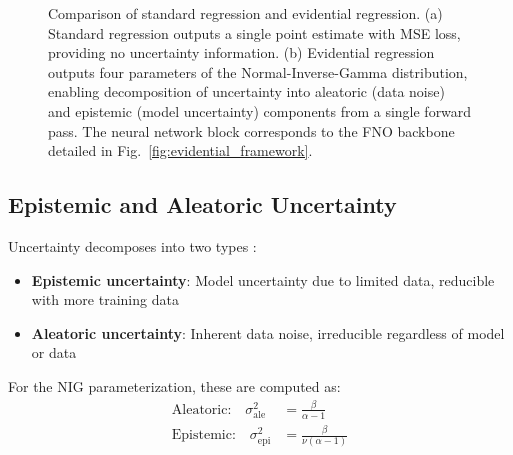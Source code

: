 \begin{figure}[htbp]
{%
}
\caption{Comparison of standard regression and evidential regression. (a) Standard regression outputs a single point estimate with MSE loss, providing no uncertainty information. (b) Evidential regression outputs four parameters of the Normal-Inverse-Gamma distribution, enabling decomposition of uncertainty into aleatoric (data noise) and epistemic (model uncertainty) components from a single forward pass. The neural network block corresponds to the FNO backbone detailed in Fig.~\ref{fig:evidential_framework}.}
\label{fig:standard_vs_evidential}
\end{figure}

\subsection{Epistemic and Aleatoric Uncertainty}

Uncertainty decomposes into two types \cite{kendall2017uncertainties,der2009aleatory}:
\begin{itemize}
    \item \textbf{Epistemic uncertainty}: Model uncertainty due to limited data, reducible with more training data
    \item \textbf{Aleatoric uncertainty}: Inherent data noise, irreducible regardless of model or data
\end{itemize}

For the NIG parameterization, these are computed as:
\begin{align}
    \text{Aleatoric:} \quad \sigma^2_{\text{ale}} &= \frac{\beta}{\alpha - 1} \\
    \text{Epistemic:} \quad \sigma^2_{\text{epi}} &= \frac{\beta}{\nu(\alpha - 1)}
\end{align}

